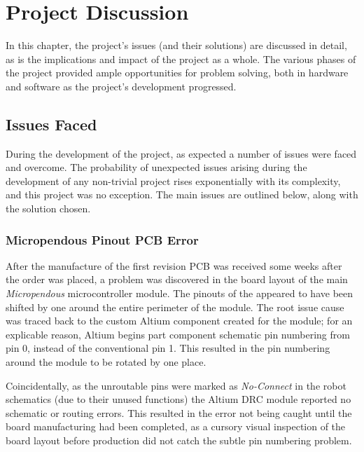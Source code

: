 \chapter{Project Discussion}
\label{chp:discussion}

In this chapter, the project's issues (and their solutions) are discussed in detail, as is the implications and impact of the project as a whole. The various phases of the project provided ample opportunities for problem solving, both in hardware and software as the project's development progressed.

\section{Issues Faced}

During the development of the project, as expected a number of issues were faced and overcome. The probability of unexpected issues arising during the development of any non-trivial project rises exponentially with its complexity, and this project was no exception. The main issues are outlined below, along with the solution chosen.

\subsection{Micropendous Pinout PCB Error}

After the manufacture of the first revision PCB was received some weeks after the order was placed, a problem was discovered in the board layout of the main \textit{Micropendous} microcontroller module. The pinouts of the appeared to have been shifted by one around the entire perimeter of the module. The root issue cause was traced back to the custom Altium component created for the module; for an explicable reason, Altium begins part component schematic pin numbering from pin 0, instead of the conventional pin 1. This resulted in the pin numbering around the module to be rotated by one place.


Coincidentally, as the unroutable pins were marked as \textit{No-Connect} in the robot schematics (due to their unused functions) the Altium DRC module reported no schematic or routing errors. This resulted in the error not being caught until the board manufacturing had been completed, as a cursory visual inspection of the board layout before production did not catch the subtle pin numbering problem.

